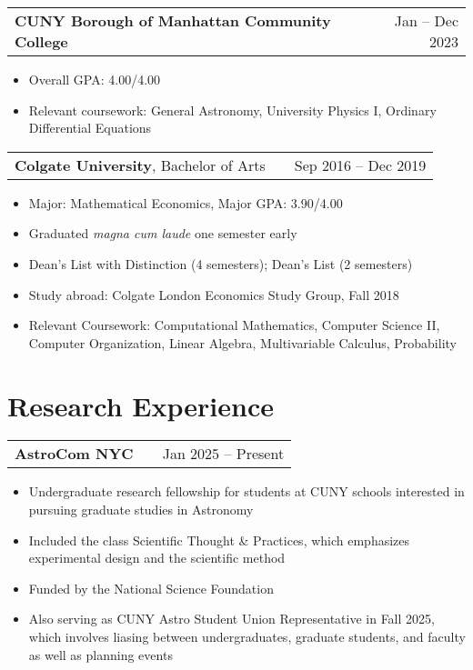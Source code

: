 \documentclass[a4paper,12pt]{article}
\makeatletter
\newenvironment{joblong}[2]
    {
    \begin{tabularx}{\linewidth}{@{}l X r@{}}
    #1 & \hfill &  #2 \\[3.75pt]
    \end{tabularx}
    \begin{minipage}[t]{\linewidth}
    \begin{itemize}[nosep,after=\strut, leftmargin=1em, itemsep=3pt,label=--]
    }
    {
    \end{itemize}
    \end{minipage}    
    }
\makeatother
\begin{document}
\begin{joblong}{\textbf{CUNY Borough of Manhattan Community College}}{Jan -- Dec 2023}
\item Overall GPA: 4.00/4.00
\item Relevant coursework: General Astronomy, University Physics I, Ordinary Differential Equations
\end{joblong}

\begin{joblong}{\textbf{Colgate University}, Bachelor of Arts}{Sep 2016 -- Dec 2019}
\item Major: Mathematical Economics, Major GPA: 3.90/4.00
\item Graduated \textit{magna cum laude} one semester early
\item Dean's List with Distinction (4 semesters); Dean's List (2 semesters)
\item Study abroad: Colgate London Economics Study Group, Fall 2018
\item Relevant Coursework: Computational Mathematics, Computer Science II, Computer Organization, Linear Algebra, Multivariable Calculus, Probability
\end{joblong}


\section{Research Experience}

\begin{joblong}{\textbf{AstroCom NYC}}{Jan 2025 -- Present}
\item Undergraduate research fellowship for students at CUNY schools interested in pursuing graduate studies in Astronomy
\item Included the class Scientific Thought \& Practices, which emphasizes experimental design and the scientific method
\item Funded by the National Science Foundation
\item Also serving as CUNY Astro Student Union Representative in Fall 2025, which involves liasing between undergraduates, graduate students, and faculty as well as planning events
\end{joblong}
\end{document}
